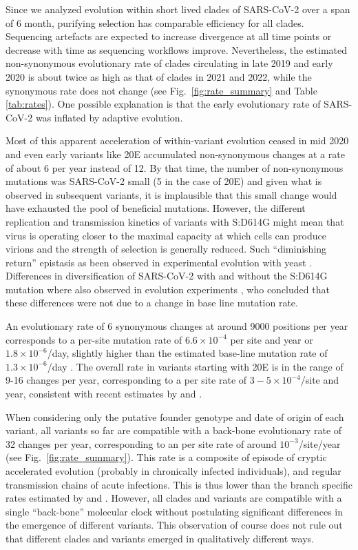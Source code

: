 \documentclass[aps,rmp, twocolumn]{revtex4}
\begin{document}
Since we analyzed evolution within short lived clades of SARS-CoV-2 over a span of 6 month, purifying selection has comparable efficiency for all clades.
Sequencing artefacts are expected to increase divergence at all time points or decrease with time as sequencing workflows improve.
Nevertheless, the estimated non-synonymous evolutionary rate of clades circulating in late 2019 and early 2020 is about twice as high as that of clades in 2021 and 2022, while the synonymous rate does not change (see Fig.~\ref{fig:rate_summary} and Table \ref{tab:rates}).
One possible explanation is that the early evolutionary rate of SARS-CoV-2 was inflated by adaptive evolution.

Most of this apparent acceleration of within-variant evolution ceased in mid 2020 and even early variants like 20E accumulated non-synonymous changes at a rate of about 6 per year instead of 12.
By that time, the number of non-synonymous mutations was SARS-CoV-2 small (5 in the case of 20E) and given what is observed in subsequent variants, it is implausible that this small change would have exhausted the pool of beneficial mutations.
However, the different replication and transmission kinetics of variants with S:D614G might mean that virus is operating closer to the maximal capacity at which cells can produce virions and the strength of selection is generally reduced.
Such ``diminishing return'' epistasis as been observed in experimental evolution with yeast \citep{kryazhimskiy_global_2014}.
Differences in diversification of SARS-CoV-2 with and without the S:D614G mutation where also observed in evolution experiments \citep{amicone_mutation_2022}, who concluded that these differences were not due to a change in base line mutation rate.

An evolutionary rate of 6 synonymous changes at around 9000 positions per year corresponds to a per-site mutation rate of $6.6\times 10^{-4}$ per site and year or $1.8\times 10^{-6}$/day, slightly higher than the estimated base-line mutation rate of $1.3\times 10^{-6}$/day \citep{amicone_mutation_2022}.
The overall rate in variants starting with 20E is in the range of 9-16 changes per year, corresponding to a per site rate of $3 - 5\times 10^{-4}$/site and year, consistent with recent estimates by \citet{hill_origins_2022} and \citet{tay_emergence_2022}.

When considering only the putative founder genotype and date of origin of each variant, all variants so far are compatible with a back-bone evolutionary rate of 32 changes per year, corresponding to an per site rate of around $10^{-3}$/site/year (see Fig.~\ref{fig:rate_summary}).
This rate is a composite of episode of cryptic accelerated evolution (probably in chronically infected individuals), and regular transmission chains of acute infections.
This is thus lower than the branch specific rates estimated by \citet{hill_origins_2022} and \citet{tay_emergence_2022}.
However, all clades and variants are compatible with a single ``back-bone'' molecular clock without postulating significant differences in the emergence of different variants.
This observation of course does not rule out that different clades and variants emerged in qualitatively different ways.
\end{document}
